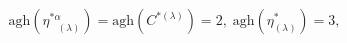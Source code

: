 \begin{equation}
\mathrm{agh}\left( \eta _{\;\;\;(\lambda )}^{*\alpha }\right) =\mathrm{agh}%
\left( C^{*(\lambda )}\right) =2,\;\mathrm{agh}\left( \eta _{(\lambda
)}^{*}\right) =3,  \label{cin9}
\end{equation}

